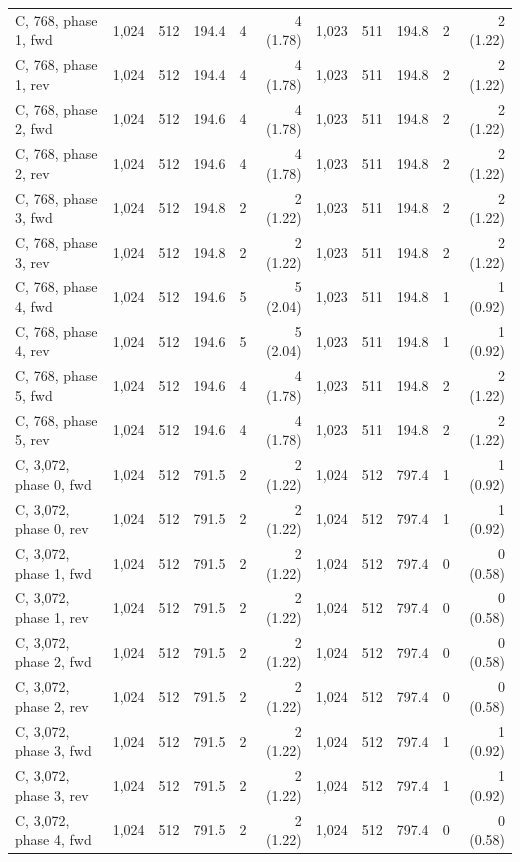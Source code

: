 \begin{tabular}{@{}l rrrrr@{\hspace{4pt}}rrrrr@{}}
C, 768, phase 1, fwd & 1{,}024 & 512 & 194.4 & 4 & 4 (1.78) & 1{,}023 & 511 & 194.8 & 2 & 2 (1.22) \\
C, 768, phase 1, rev & 1{,}024 & 512 & 194.4 & 4 & 4 (1.78) & 1{,}023 & 511 & 194.8 & 2 & 2 (1.22) \\
C, 768, phase 2, fwd & 1{,}024 & 512 & 194.6 & 4 & 4 (1.78) & 1{,}023 & 511 & 194.8 & 2 & 2 (1.22) \\
C, 768, phase 2, rev & 1{,}024 & 512 & 194.6 & 4 & 4 (1.78) & 1{,}023 & 511 & 194.8 & 2 & 2 (1.22) \\
C, 768, phase 3, fwd & 1{,}024 & 512 & 194.8 & 2 & 2 (1.22) & 1{,}023 & 511 & 194.8 & 2 & 2 (1.22) \\
C, 768, phase 3, rev & 1{,}024 & 512 & 194.8 & 2 & 2 (1.22) & 1{,}023 & 511 & 194.8 & 2 & 2 (1.22) \\
C, 768, phase 4, fwd & 1{,}024 & 512 & 194.6 & 5 & 5 (2.04) & 1{,}023 & 511 & 194.8 & 1 & 1 (0.92) \\
C, 768, phase 4, rev & 1{,}024 & 512 & 194.6 & 5 & 5 (2.04) & 1{,}023 & 511 & 194.8 & 1 & 1 (0.92) \\
C, 768, phase 5, fwd & 1{,}024 & 512 & 194.6 & 4 & 4 (1.78) & 1{,}023 & 511 & 194.8 & 2 & 2 (1.22) \\
C, 768, phase 5, rev & 1{,}024 & 512 & 194.6 & 4 & 4 (1.78) & 1{,}023 & 511 & 194.8 & 2 & 2 (1.22) \\
C, 3{,}072, phase 0, fwd & 1{,}024 & 512 & 791.5 & 2 & 2 (1.22) & 1{,}024 & 512 & 797.4 & 1 & 1 (0.92) \\
C, 3{,}072, phase 0, rev & 1{,}024 & 512 & 791.5 & 2 & 2 (1.22) & 1{,}024 & 512 & 797.4 & 1 & 1 (0.92) \\
C, 3{,}072, phase 1, fwd & 1{,}024 & 512 & 791.5 & 2 & 2 (1.22) & 1{,}024 & 512 & 797.4 & 0 & 0 (0.58) \\
C, 3{,}072, phase 1, rev & 1{,}024 & 512 & 791.5 & 2 & 2 (1.22) & 1{,}024 & 512 & 797.4 & 0 & 0 (0.58) \\
C, 3{,}072, phase 2, fwd & 1{,}024 & 512 & 791.5 & 2 & 2 (1.22) & 1{,}024 & 512 & 797.4 & 0 & 0 (0.58) \\
C, 3{,}072, phase 2, rev & 1{,}024 & 512 & 791.5 & 2 & 2 (1.22) & 1{,}024 & 512 & 797.4 & 0 & 0 (0.58) \\
C, 3{,}072, phase 3, fwd & 1{,}024 & 512 & 791.5 & 2 & 2 (1.22) & 1{,}024 & 512 & 797.4 & 1 & 1 (0.92) \\
C, 3{,}072, phase 3, rev & 1{,}024 & 512 & 791.5 & 2 & 2 (1.22) & 1{,}024 & 512 & 797.4 & 1 & 1 (0.92) \\
C, 3{,}072, phase 4, fwd & 1{,}024 & 512 & 791.5 & 2 & 2 (1.22) & 1{,}024 & 512 & 797.4 & 0 & 0 (0.58) \\

\end{tabular}
